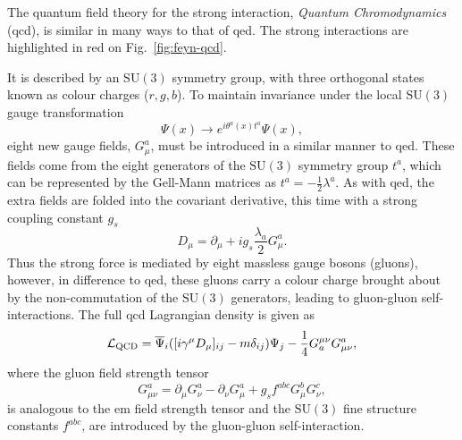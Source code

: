 The quantum field theory for the strong interaction, \textit{Quantum Chromodynamics} (\acrshort{qcd}), is similar in many ways to that of \acrshort{qed}.
The strong interactions are highlighted in red on Fig.~\ref{fig:feyn-qcd}.

It is described by an $\mathrm{SU(3)}$ symmetry group, with three orthogonal states known as colour charges ($r,g,b$).
To maintain invariance under the local $\mathrm{SU(3)}$ gauge transformation
\begin{equation}
\Psi(x) \to e^{i\theta^{a}(x)t^{a}}\Psi(x),
\end{equation}
eight new gauge fields, $G_{\mu}^{a}$, must be introduced in a similar manner to \acrshort{qed}.
These fields come from the eight generators of the $\mathrm{SU(3)}$ symmetry group $t^{a}$, which can be represented by the Gell-Mann matrices as $t^{a}=-\frac{1}{2}\lambda^{a}$.
As with \acrshort{qed}, the extra fields are folded into the covariant derivative, this time with a strong coupling constant $g_{s}$
\begin{equation}
D_{\mu} = \partial_{\mu}+ig_{s}\frac{\lambda_{a}}{2}G_{\mu}^{a}.
\end{equation}
Thus the strong force is mediated by eight massless gauge bosons (gluons), however, in difference to \acrshort{qed}, these gluons carry a colour charge brought about by the non-commutation of the $\mathrm{SU(3)}$ generators, leading to gluon-gluon self-interactions.
The full \acrshort{qcd} Lagrangian density is given as
\begin{equation}
\mathcal{L}_{\mathrm{QCD}}=\overline{\Psi}_{i}([i\gamma^{\mu}D_{\mu}]_{ij}-m\delta_{ij})\Psi_{j} - \frac{1}{4}G^{\mu \nu}_{a}G^{a}_{\mu \nu},
\end{equation}
where the gluon field strength tensor 
\begin{equation}
	G_{\mu \nu}^{a}=\partial_{\mu}G_{\nu}^{a} - \partial_{\nu}G_{\mu}^{a} + g_{s}f^{abc}G_{\mu}^{b}G_{\nu }^{c},
\end{equation}
is analogous to the \acrshort{em} field strength tensor and the $\mathrm{SU(3)}$ fine structure constants $f^{abc}$, are introduced by the gluon-gluon self-interaction.

